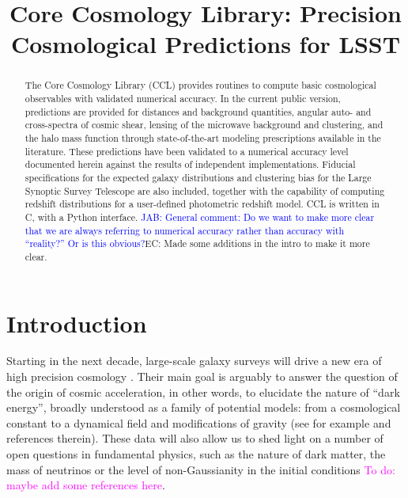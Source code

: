 \documentclass[\docopts]{\docclass}
\newcommand{\todo}[1]{\textcolor{magenta}{To do: #1}}
\newcommand{\jab}[1]{\textcolor{blue}{JAB: #1}}
\newcommand{\elisa}[1]{\textcolor{green!10!orange!90!}{EC: #1}}
\begin{document}
\title{Core Cosmology Library: Precision Cosmological Predictions for LSST}

\maketitlepre

\begin{abstract}

The Core Cosmology Library (CCL) provides routines to compute basic cosmological observables with validated numerical accuracy. In the current public version, predictions are provided for distances and background quantities, angular auto- and cross-spectra of cosmic shear, lensing of the microwave background and clustering, and the halo mass function through state-of-the-art modeling prescriptions available in the literature. These predictions  have been validated to a numerical accuracy level documented herein against the results of independent implementations. Fiducial specifications for the expected galaxy distributions and clustering bias for the Large Synoptic Survey Telescope are also included, together with the capability of computing redshift distributions for a user-defined photometric redshift model. CCL is written in C, with a Python interface. 
\jab{General comment: Do we want to make more clear that we are always referring to numerical accuracy rather than accuracy with ``reality?'' Or is this obvious?}\elisa{Made some additions in the intro to make it more clear.}

\end{abstract}


\maketitlepost

\newpage
\tableofcontents{}
\newpage



\section{Introduction}
\label{sec:intro}

Starting in the next decade, large-scale galaxy surveys will drive a new era of high precision cosmology \citep{DESCWhite,green11,Laureijs11}. Their main goal is arguably to answer the question of the origin of cosmic acceleration, in other words, to elucidate the nature of ``dark energy'', broadly understood as a family of potential models: from a cosmological constant to a dynamical field and modifications of gravity (see for example  \cite{Carroll2001CC,Peebles2003,Padmanabhan2003,Copeland2006,Ishak2007,Weinberg13} and references therein). These data will also allow us to shed light on a number of open questions in fundamental physics, such as the nature of dark matter, the mass of neutrinos or the level of non-Gaussianity in the initial conditions \todo{maybe add some references here}.
\end{document}
